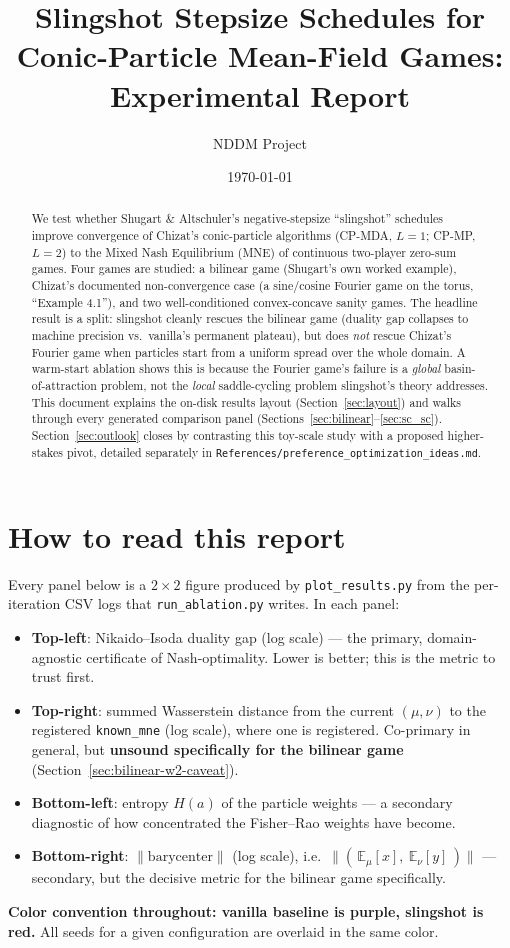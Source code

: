 \documentclass[11pt]{article}
\title{Slingshot Stepsize Schedules for Conic-Particle Mean-Field Games:\\
Experimental Report}
\author{NDDM Project}
\date{\today}
\begin{document}
\maketitle

\begin{abstract}
We test whether Shugart \& Altschuler's negative-stepsize ``slingshot'' schedules
improve convergence of Chizat's conic-particle algorithms (CP-MDA, $L=1$; CP-MP,
$L=2$) to the Mixed Nash Equilibrium (MNE) of continuous two-player zero-sum games.
Four games are studied: a bilinear game (Shugart's own worked example), Chizat's
documented non-convergence case (a sine/cosine Fourier game on the torus,
``Example 4.1''), and two well-conditioned convex-concave sanity games. The
headline result is a split: slingshot cleanly rescues the bilinear game (duality
gap collapses to machine precision vs.\ vanilla's permanent plateau), but does
\emph{not} rescue Chizat's Fourier game when particles start from a uniform
spread over the whole domain. A warm-start ablation shows this is because the
Fourier game's failure is a \emph{global} basin-of-attraction problem, not the
\emph{local} saddle-cycling problem slingshot's theory addresses. This document
explains the on-disk results layout (Section~\ref{sec:layout}) and walks through
every generated comparison panel (Sections~\ref{sec:bilinear}--\ref{sec:sc_sc}).
Section~\ref{sec:outlook} closes by contrasting this toy-scale study with a
proposed higher-stakes pivot, detailed separately in
\texttt{References/preference\_optimization\_ideas.md}.
\end{abstract}

\tableofcontents

\section{How to read this report}
Every panel below is a $2\times2$ figure produced by \texttt{plot\_results.py}
from the per-iteration CSV logs that \texttt{run\_ablation.py} writes. In each
panel:
\begin{itemize}
  \item \textbf{Top-left}: Nikaido--Isoda duality gap (log scale) --- the primary,
  domain-agnostic certificate of Nash-optimality. Lower is better; this is the
  metric to trust first.
  \item \textbf{Top-right}: summed Wasserstein distance from the current $(\mu,\nu)$
  to the registered \texttt{known\_mne} (log scale), where one is registered.
  Co-primary in general, but \textbf{unsound specifically for the bilinear game}
  (Section~\ref{sec:bilinear-w2-caveat}).
  \item \textbf{Bottom-left}: entropy $H(a)$ of the particle weights --- a secondary
  diagnostic of how concentrated the Fisher--Rao weights have become.
  \item \textbf{Bottom-right}: $\lVert \text{barycenter}\rVert$ (log scale), i.e.\
  $\lVert(\,\mathbb{E}_\mu[x],\ \mathbb{E}_\nu[y]\,)\rVert$ --- secondary, but the
  decisive metric for the bilinear game specifically.
\end{itemize}
\textbf{Color convention throughout: vanilla baseline is purple, slingshot is red.}
All seeds for a given configuration are overlaid in the same color.
\end{document}
